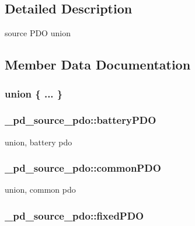 \subsection{Detailed Description}
source P\-D\-O union 

\subsection{Member Data Documentation}
\hypertarget{struct__pd__source__pdo_a467642c60beaed4560b8b9faad6d2d14}{\subsubsection[{"@37}]{\setlength{\rightskip}{0pt plus 5cm}union \{ ... \} }}\label{struct__pd__source__pdo_a467642c60beaed4560b8b9faad6d2d14}
\hypertarget{struct__pd__source__pdo_ae677c279b52a30bc6ca29600d978757e}{
\subsubsection[{battery\-P\-D\-O}]{ \-\_\-pd\-\_\-source\-\_\-pdo\-::battery\-P\-D\-O}}\label{struct__pd__source__pdo_ae677c279b52a30bc6ca29600d978757e}
union, battery pdo \hypertarget{struct__pd__source__pdo_ad1af05b25c2dfc8f72eea50707536c10}{
\subsubsection[{common\-P\-D\-O}]{ \-\_\-pd\-\_\-source\-\_\-pdo\-::common\-P\-D\-O}}\label{struct__pd__source__pdo_ad1af05b25c2dfc8f72eea50707536c10}
union, common pdo \hypertarget{struct__pd__source__pdo_a2405f8ee75a370cba4a48b94080958b1}{
\subsubsection[{fixed\-P\-D\-O}]{ \-\_\-pd\-\_\-source\-\_\-pdo\-::fixed\-P\-D\-O}}\label{struct__pd__source__pdo_a2405f8ee75a370cba4a48b94080958b1}
